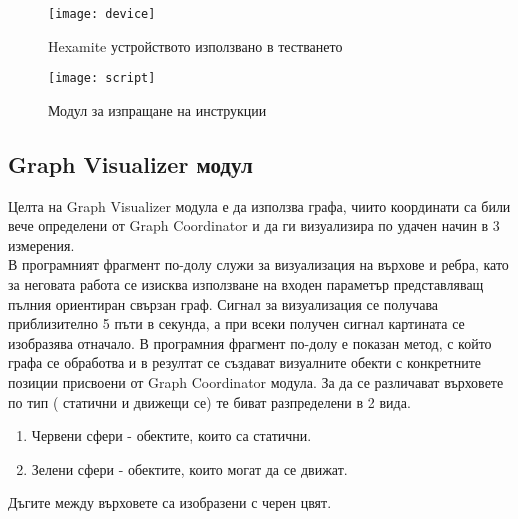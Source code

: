 \begin{figure}
    \centerline{\texttt{[image: device]}}
    \caption{Hexamite устройството използвано в тестването}
    \label{fig:device}
\end{figure}

\begin{figure}
    \centerline{\texttt{[image: script]}}
    \caption{Модул за изпращане на инструкции}
    \label{fig:script}
\end{figure}

\subsection{Graph Visualizer модул}
Целта на Graph Visualizer модула е да използва графа, чиито координати са били вече определени от Graph Coordinator и да ги визуализира по удачен начин в 3 измерения.\\
В програмният фрагмент по-долу служи за визуализация на върхове и ребра, като за неговата работа се изисква използване на входен параметър представляващ пълния ориентиран свързан граф. Сигнал за визуализация се получава приблизително 5 пъти в секунда, а при всеки получен сигнал картината се изобразява отначало. В програмния фрагмент по-долу е показан метод, с който графа се обработва и в резултат се създават визуалните обекти с конкретните позиции присвоени от Graph Coordinator модула. За да се различават върховете по тип ( статични и движещи се) те биват разпределени в 2 вида.

\begin{enumerate}
    \item Червени сфери - обектите, които са статични.
    \item Зелени сфери - обектите, които могат да се движат.
\end{enumerate}

Дъгите между върховете са изобразени с черен цвят.

